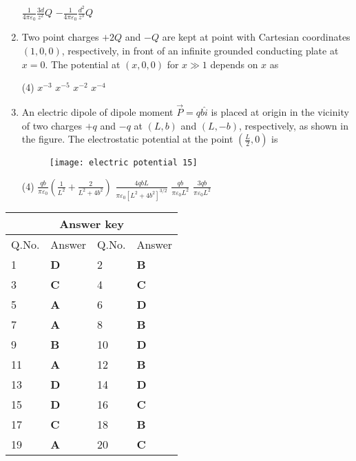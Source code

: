 \begin{enumerate}[label=\color{ocre}\textbf{\arabic*.}]
\begin{tasks}
	\task[\textbf{C.}] $\frac{1}{4 \pi \varepsilon_{0}} \frac{3 d}{z^{2}} Q$
	\task[\textbf{D.}] $-\frac{1}{4 \pi \varepsilon_{0}} \frac{d^{2}}{z^{3}} Q$
\end{tasks}
\item  Two point charges $+2 Q$ and $-Q$ are kept at point with Cartesian coordinates $(1,0,0)$, respectively, in front of an infinite grounded conducting plate at $x=0$. The potential at $(x, 0,0)$ for $x \gg 1$ depends on $x$ as
{}
\begin{tasks}(4)
	\task[\textbf{A.}] $x^{-3}$
	\task[\textbf{B.}]  $x^{-5}$
	\task[\textbf{C.}] $x^{-2}$
	\task[\textbf{D.}] $x^{-4}$
\end{tasks}
\item An electric dipole of dipole moment $\vec{P}=q b \hat{i}$ is placed at origin in the vicinity of two charges $+q$ and $-q$ at $(L, b)$ and $(L,-b)$, respectively, as shown in the figure. The electrostatic potential at the point $\left(\frac{L}{2}, 0\right)$ is
{}
\begin{figure}[H]
	\centering
	\texttt{[image: electric potential 15]}
\end{figure}
\begin{tasks}(4)
	\task[\textbf{A.}] $\frac{q b}{\pi \varepsilon_{0}}\left(\frac{1}{L^{2}}+\frac{2}{L^{2}+4 b^{2}}\right)$
	\task[\textbf{B.}] $\frac{4 q b L}{\pi \varepsilon_{0}\left[L^{2}+4 b^{2}\right]^{3 / 2}}$
	\task[\textbf{C.}] $\frac{q b}{\pi \varepsilon_{0} L^{2}}$
	\task[\textbf{D.}] $\frac{3 q b}{\pi \varepsilon_{0} L^{2}}$
\end{tasks}
\end{enumerate}
\setlength\arrayrulewidth{1pt}
\begin{table}[H]
	\centering
	\begin{tabular}{|p{1.5cm}|p{1.5cm}||p{1.5cm}|p{1.5cm}|}
		\hline
		\multicolumn{4}{|c|}{\textbf{Answer key}}\\\hline\hline
		\rowcolor{ocrel}Q.No.&Answer&Q.No.&Answer\\\hline
		1&\textbf{D} &2&\textbf{B}\\\hline 
		3&\textbf{C} &4&\textbf{C} \\\hline
		5&\textbf{A} &6&\textbf{D} \\\hline
		7&\textbf{A}&8&\textbf{B}\\\hline
		9&\textbf{B}&10&\textbf{D}\\\hline
		11&\textbf{A} &12&\textbf{B}\\\hline
		13&\textbf{D}&14&\textbf{D}\\\hline
		15&\textbf{D}&16&\textbf{C}\\\hline
		17&\textbf{C} &18&\textbf{B}\\\hline 
		19&\textbf{A} &20&\textbf{C} \\\hline
	\end{tabular}
\end{table}
